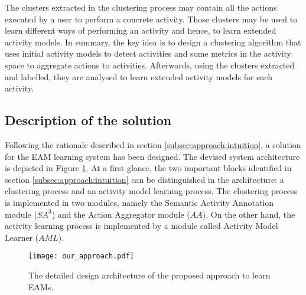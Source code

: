 The clusters extracted in the clustering process may contain all the actions executed by a user to perform a concrete activity. Those clusters may be used to learn different ways of performing an activity and hence, to learn extended activity models. In summary, the key idea is to design a clustering algorithm that uses initial activity models to detect activities and some metrics in the activity space to aggregate actions to activities. Afterwards, using the clusters extracted and labelled, they are analysed to learn extended activity models for each activity.


\subsection{Description of the solution}
Following the rationale described in section \ref{subsec:approach:intuition}, a solution for the EAM learning system has been designed. The devised system architecture is depicted in Figure \ref{fig-design}. At a first glance, the two important blocks identified in section \ref{subsec:approach:intuition} can be distinguished in the architecture: a clustering process and an activity model learning process. The clustering process is implemented in two modules, namely the Semantic Activity Annotation module ($SA^3$) and the Action Aggregator module ($AA$). On the other hand, the activity learning process is implemented by a module called Activity Model Learner ($AML$). 

\begin{figure}[htbp]
\centering
\texttt{[image: our\_approach.pdf]}
    \caption{The detailed design architecture of the proposed approach to learn EAMs.}
    \label{fig-design}
\end{figure}

